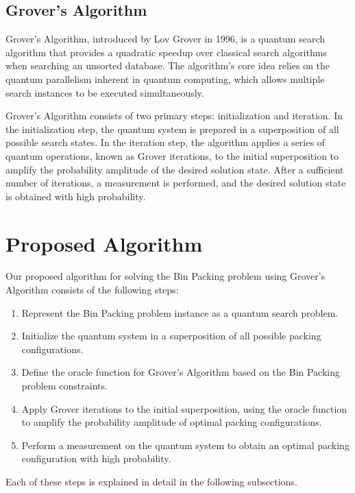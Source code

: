 \subsection{Grover's Algorithm}

Grover's Algorithm, introduced by Lov Grover in 1996, is a quantum search algorithm that provides a quadratic speedup over classical search algorithms when searching an unsorted database. The algorithm's core idea relies on the quantum parallelism inherent in quantum computing, which allows multiple search instances to be executed simultaneously.

Grover's Algorithm consists of two primary steps: initialization and iteration. In the initialization step, the quantum system is prepared in a superposition of all possible search states. In the iteration step, the algorithm applies a series of quantum operations, known as Grover iterations, to the initial superposition to amplify the probability amplitude of the desired solution state. After a sufficient number of iterations, a measurement is performed, and the desired solution state is obtained with high probability.

\section{Proposed Algorithm} \label{sec:algorithm}

Our proposed algorithm for solving the Bin Packing problem using Grover's Algorithm consists of the following steps:

\begin{enumerate}
  \item Represent the Bin Packing problem instance as a quantum search problem.
  \item Initialize the quantum system in a superposition of all possible packing configurations.
  \item Define the oracle function for Grover's Algorithm based on the Bin Packing problem constraints.
  \item Apply Grover iterations to the initial superposition, using the oracle function to amplify the probability amplitude of optimal packing configurations.
  \item Perform a measurement on the quantum system to obtain an optimal packing configuration with high probability.
\end{enumerate}

Each of these steps is explained in detail in the following subsections.


